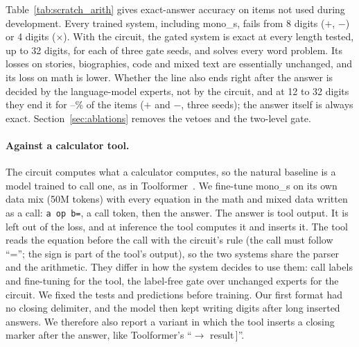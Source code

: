 \documentclass[10pt]{article}
\newcommand{\pending}[1]{{\color{red}\textbf{[#1]}}}
\begin{document}
Table~\ref{tab:scratch_arith} gives exact-answer accuracy on items not used during development.
Every trained system, including mono\_s, fails from 8 digits ($+$, $-$) or 4 digits ($\times$).
With the circuit, the gated system is exact at every length tested, up to 32 digits, for each of
three gate seeds, and solves every word problem. Its losses on stories, biographies, code and
mixed text are essentially unchanged, and its loss on math is lower. Whether the line also ends right after the answer is decided by the
language-model experts, not by the circuit, and at 12 to 32 digits they end it for
\resTrackCLineMatchMin--\resTrackCLineMatchMax\% of the items ($+$ and $-$, three seeds); the
answer itself is always exact. Section~\ref{sec:ablations} removes the vetoes and
the two-level gate.
\begin{table}[t]
\centering\small
\caption{Arithmetic on held-out items: percentage of answers whose number is exact, against
digits per operand (100 items per cell), and word problems.}
\label{tab:scratch_arith}
{\footnotesize\setlength{\tabcolsep}{2.5pt}\IfFileExists{tables/track_c_arith.tex}{}{\pending{table}}}
\end{table}

\paragraph{Against a calculator tool.} The circuit computes what a calculator computes, so the
natural baseline is a model trained to call one, as in Toolformer~\citep{schick2023toolformer}.
We fine-tune mono\_s on its own data mix (50M tokens) with every equation in the math and mixed
data written as a call: \texttt{a op b=}, a call token, then the answer. The answer is tool
output. It is left out of the loss, and at inference the tool computes it and inserts it. The
tool reads the equation before the call with the circuit's rule (the call must follow ``='';
the sign is part of the tool's output), so the two systems share the parser and
the arithmetic. They differ in how the system decides to use them: call labels and fine-tuning
for the tool, the label-free gate over unchanged experts for the circuit. We fixed the tests
and predictions before training. Our first format had no closing delimiter, and the model then
kept writing digits after long inserted answers. We therefore also report a variant in which the
tool inserts a closing marker after the answer, like Toolformer's ``$\rightarrow$
result\,]''.
\end{document}
